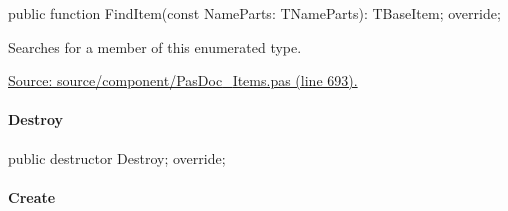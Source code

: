 \documentclass{report}
\newif\ifpdf
\begin{document}
\label{PasDoc_Items.TPasEnum-FindItem}
\begin{list}{}{
\setlength{\itemindent}{0cm}
\setlength{\listparindent}{0cm}
\setlength{\leftmargin}{\evensidemargin}
\addtolength{\leftmargin}{\tmplength}
\settowidth{\labelsep}{X}
\addtolength{\leftmargin}{\labelsep}
\setlength{\labelwidth}{\tmplength}
}
\item[\textbf{Declaration}\hfill]
\ifpdf
\begin{flushleft}
\fi
\begin{ttfamily}
public function FindItem(const NameParts: TNameParts): TBaseItem; override;\end{ttfamily}

\ifpdf
\end{flushleft}
\fi

\par
\item[\textbf{Description}]
Searches for a member of this enumerated type.\par
\href{https://github.com/pasdoc/pasdoc/blob/master/source/component/PasDoc_Items.pas#L693}{Source: source/component/PasDoc{\_}Items.pas (line 693).}

\end{list}
\paragraph*{Destroy}\hspace*{\fill}

\label{PasDoc_Items.TPasEnum-Destroy}
\begin{list}{}{
\setlength{\itemindent}{0cm}
\setlength{\listparindent}{0cm}
\setlength{\leftmargin}{\evensidemargin}
\addtolength{\leftmargin}{\tmplength}
\settowidth{\labelsep}{X}
\addtolength{\leftmargin}{\labelsep}
\setlength{\labelwidth}{\tmplength}
}
\item[\textbf{Declaration}\hfill]
\ifpdf
\begin{flushleft}
\fi
\begin{ttfamily}
public destructor Destroy; override;\end{ttfamily}

\ifpdf
\end{flushleft}
\fi

\end{list}
\paragraph*{Create}\hspace*{\fill}
\end{document}

